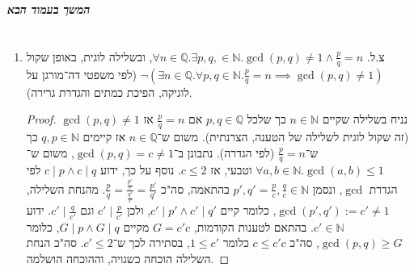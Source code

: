 \documentclass[]{article}
\newcommand\she   {\end{otherlanguage}}
\newcommand\npage {\vfil {\hfil \textbf{\textit{המשך בעמוד הבא}}} \hfil \vfil \pagebreak}
\newcommand\N     {\mathbb{N}}
\newcommand\Q     {\mathbb{Q}}
\begin{document}
		
		\npage
		\section{}
		\begin{enumerate}[A']
			\item צ.ל. 
			$ \forall n \in \Q. \exists p, q, \in \N. \gcd(p, q) \neq 1 \land \tfrac{p}{q} = n $, ובשלילה לוגית, באופן שקול $ \lnot(\exists n \in \Q. \forall p, q \in \N. \tfrac{p}{q}=n \implies \gcd(p, q) \neq 1) $ (לפי משפטי דה־מורגן על לוגיקה, הפיכת כמתים והגדרת גרירה). 
			\begin{proof}
				נניח בשלילה שקיים $ n \in \N $ כך שלכל $ p, q \in \Q $ אם $ \tfrac{p}{q} = n $ אז $  \gcd(p, q) \neq 1 $ (זה שקול לוגית לשלילה של הטענה, הצרנתית). משום ש־$ n \in \Q $ אז קיימים $ q, p \in \N $ כך ש־$ \tfrac{p}{q} = n $ (לפי הגדרה). נתבונן ב־$ \gcd(p, q) = c \neq 1 $, משום ש־$ \forall a, b \in \N. \gcd(a, b) \le 1 $ וטבעי, אז $ c \le 2 $. נוסף על כך, ידוע $ c \mid p \land c \mid q $ לפי הגדרת $ \gcd $, ונסמן $ p', q' = \tfrac{p}{c}, \tfrac{q}{c} \in \N $ בהתאמה, סה"כ $ \frac{p}{q} = \frac{\frac{p'}{c}}{\frac{q'}{c}} = \frac{p'}{q'} $. מהנחת השלילה, $ \gcd(p', q') := c' \neq 1 $, כלומר קיים $ c' \mid p' \land c' \mid q' $, ולכן $ c' \mid \tfrac{p}{c'} $ וגם $ c' \mid \tfrac{q}{c'} $. ידוע $ c' \in \N $. בהתאם לטענות הקודמות, $ G = c'c $ מקיים $ G \mid p \land G \mid q $, כלומר $ \gcd(p, q) \ge G $, סה"כ $ c \le c'c $ כלומר $ 1 \le c' $, בסתירה לכך ש־$ c' \le 2 $. סה"כ הנחת השלילה הוכחה כשגויה, וההוכחה הושלמה. 
			\end{proof}
		\end{enumerate}
		
\end{document}
